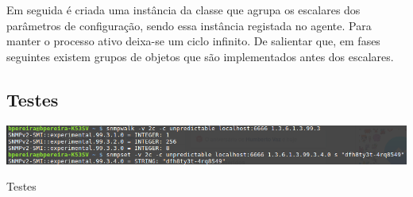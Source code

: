 Em seguida é criada uma instância da classe que agrupa os escalares dos
parâmetros de configuração, sendo essa instância registada no agente.  Para
manter o processo ativo deixa-se um ciclo infinito. De salientar que, em fases
seguintes existem grupos de objetos que são implementados antes dos escalares.

\subsection{Testes}

\begin{center}
 	
 	\includegraphics[width=\textwidth,height=\textheight,keepaspectratio]{resources/images/faseB/faseB.png}
 	\captionsetup{type=figure, width=0.8\linewidth}
	\caption{Testes}
\label{fig:faseB:teste} 
\end{center}







